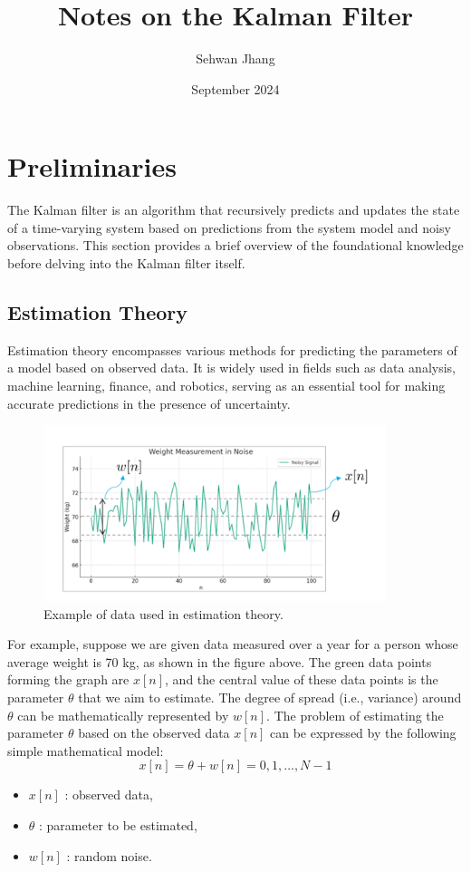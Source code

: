 \documentclass[12pt,a4paper]{article}
\title{Notes on the Kalman Filter}
\author{Sehwan Jhang}
\date{September 2024}
\begin{document}
\maketitle

\section{Preliminaries}
The Kalman filter is an algorithm that recursively predicts and
updates the state of a time-varying system based on predictions from the system model
and noisy observations.
This section provides a brief overview of the foundational knowledge before delving
into the Kalman filter itself.

\subsection{Estimation Theory}

Estimation theory encompasses various methods for predicting the parameters
of a model based on observed data. It is widely used in fields such as data analysis,
machine learning, finance, and robotics, serving as an essential tool for making accurate predictions
in the presence of uncertainty.

\begin{figure}[!htbp] %
    \centerline{\includegraphics[width=10cm]{image1.png}}
    \caption{Example of data used in estimation theory.}
\end{figure}

For example, suppose we are given data measured over a year for a person whose average
weight is 70 kg, as shown in the figure above.
The green data points forming the graph are \(x[n]\), and the central value of these data points is the parameter \(\theta\) that we aim to estimate.
The degree of spread (i.e., variance) around \(\theta\) can be mathematically represented by \(w[n]\).
The problem of estimating the parameter \(\theta\) based on the observed data \(x[n]\) can be expressed
by the following simple mathematical model:
\begin{equation}
    x[n] = \theta + w[n]= 0, 1, \ldots, N - 1
\end{equation}
\begin{itemize}
    \item \(x[n]\) : observed data,
    \item \(\theta\) : parameter to be estimated,
    \item \(w[n]\) : random noise.
\end{itemize}
\end{document}
